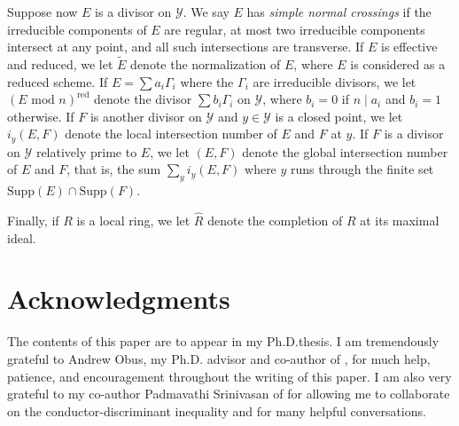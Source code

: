 \documentclass[12pt]{amsart}
\numberwithin{equation}{section}
\theoremstyle{definition}
\newcommand{\X}{\mathcal{X}}
\newcommand{\Y}{\mathcal{Y}}
\newcommand{\tx}[1]{\text{#1}}
\begin{document}
Suppose now $E$ is a divisor on $\Y$. We say $E$ has \textit{simple normal crossings} if the irreducible components of $E$ are regular, at most two irreducible components intersect at any point, and all such intersections are transverse. If $E$ is effective and reduced, we let $\widetilde{E}$ denote the normalization of $E$, where $E$ is considered as a reduced scheme. If $E=\sum a_i\Gamma_i$ where the $\Gamma_i$ are irreducible divisors, we let $(E\tx{ mod }n)^\tx{red}$ denote the divisor $\sum b_i\Gamma_i$ on $\Y$, where $b_i=0$ if $n\mid a_i$ and $b_i=1$ otherwise. If $F$ is another divisor on $\Y$ and $y\in\Y$ is a closed point, we let $i_y(E,F)$ denote the local intersection number of $E$ and $F$ at $y$. If $F$ is a divisor on $\Y$ relatively prime to $E$, we let $(E,F)$ denote the global intersection number of $E$ and $F$, that is, the sum $\sum_y i_y(E,F)$ where $y$ runs through the finite set $\tx{Supp}(E)\cap\tx{Supp}(F)$.

Finally, if $R$ is a local ring, we let $\widehat{R}$ denote the completion of $R$ at its maximal ideal.


\section*{Acknowledgments}
The contents of this paper are to appear in my Ph.D.\:thesis. I am tremendously grateful to Andrew Obus, my Ph.D. advisor and co-author of \cite{Part1}, for much help, patience, and encouragement throughout the writing of this paper. I am also very grateful to my co-author Padmavathi Srinivasan of \cite{Part1} for allowing me to collaborate on the conductor-discriminant inequality and for many helpful conversations.
\end{document}
